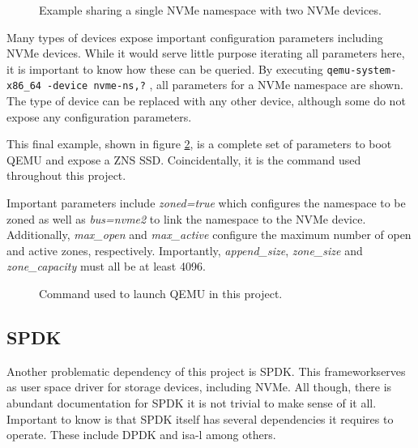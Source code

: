 \documentclass[conference]{IEEEtran}
\newcommand\bashstyle{
	\lstset{
		language=Bash,
		basicstyle=\ttm,
		showstringspaces=false,
		tabsize=2,
		aboveskip=0.2cm,
		belowskip=0.2cm,
		prebreak=\textbackslash,
		extendedchars=true,
		mathescape=false,
		linewidth=8.85cm,
		breaklines=true
	}
}
\newcommand\bashinline[1]{{\bashstyle\lstinline!#1!}}
\newcommand\bashexternal[2][]{{\bashstyle}}
\begin{document}
\begin{center}
	\begin{figure}[H]
		\bashexternal{resources/bash/nvme-subsystem.sh}
		\captionsetup{justification=centering}
		\caption{Example sharing a single NVMe namespace with two NVMe devices.}
		\label{fig:example-nvme-subsystems}
	\end{figure}
\end{center}

Many types of devices expose important configuration parameters including
NVMe devices. While it would serve little purpose iterating all parameters here,
it is important to know how these can be queried. By
executing\bashinline{qemu-system-x86_64 -device nvme-ns,?} , all parameters for
a NVMe namespace are shown. The type of device can be replaced with any other
device, although some do not expose any configuration parameters.

This final example, shown in figure \ref{fig:qemu-launch}, is a complete set of
parameters to boot QEMU and expose a ZNS SSD. Coincidentally, it is the
command used throughout this project.

Important parameters include \textit{zoned=true} which configures the namespace
to be zoned as well as \textit{bus=nvme2} to link the namespace to the NVMe
device. Additionally, \textit{max\_open} and \textit{max\_active} configure the
maximum number of open and active zones, respectively. Importantly,
\textit{append\_size}, \textit{zone\_size} and \textit{zone\_capacity} must all
be at least 4096.

\begin{center}
	\begin{figure}[H]
		\bashexternal{resources/bash/qemu-launch.sh}
		\captionsetup{justification=centering}
		\caption{Command used to launch QEMU in this project.}
		\label{fig:qemu-launch}
	\end{figure}
\end{center}

\subsection{SPDK}

Another problematic dependency of this project is SPDK. This
framework\footnotemark[2] serves as user space driver for storage devices,
including NVMe. All though, there is abundant documentation for SPDK it is
not trivial to make sense of it all. Important to know is that SPDK itself has
several dependencies it requires to operate. These include DPDK and isa-l among
others.
\end{document}
